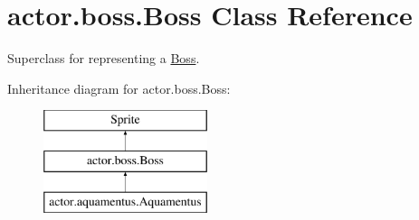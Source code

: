 \hypertarget{classactor_1_1boss_1_1_boss}{}\section{actor.\+boss.\+Boss Class Reference}
\label{classactor_1_1boss_1_1_boss}


Superclass for representing a \hyperlink{classactor_1_1boss_1_1_boss}{Boss}.  


Inheritance diagram for actor.\+boss.\+Boss\+:\begin{figure}[H]
\begin{center}
\leavevmode
\includegraphics[height=3.000000cm]{classactor_1_1boss_1_1_boss}
\end{center}
\end{figure}
